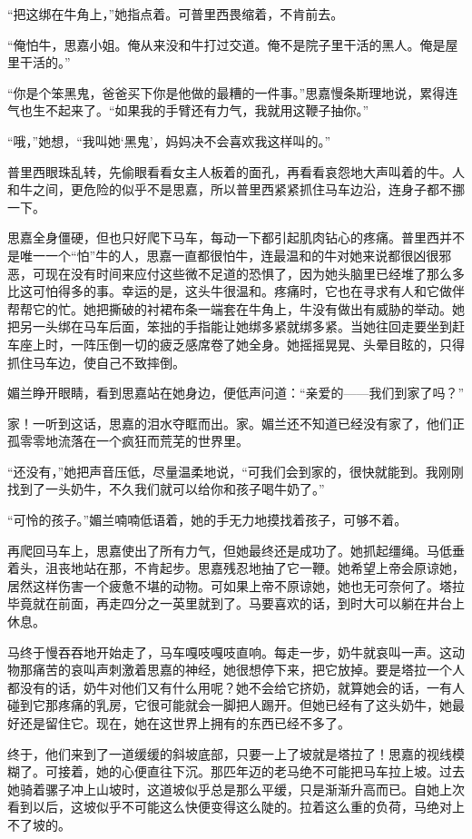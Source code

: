 \par “把这绑在牛角上，”她指点着。可普里西畏缩着，不肯前去。
\par “俺怕牛，思嘉小姐。俺从来没和牛打过交道。俺不是院子里干活的黑人。俺是屋里干活的。”
\par “你是个笨黑鬼，爸爸买下你是他做的最糟的一件事。”思嘉慢条斯理地说，累得连气也生不起来了。“如果我的手臂还有力气，我就用这鞭子抽你。”
\par “哦，”她想，“我叫她‘黑鬼’，妈妈决不会喜欢我这样叫的。”
\par 普里西眼珠乱转，先偷眼看看女主人板着的面孔，再看看哀怨地大声叫着的牛。人和牛之间，更危险的似乎不是思嘉，所以普里西紧紧抓住马车边沿，连身子都不挪一下。
\par 思嘉全身僵硬，但也只好爬下马车，每动一下都引起肌肉钻心的疼痛。普里西并不是唯一一个“怕”牛的人，思嘉一直都很怕牛，连最温和的牛对她来说都很凶很邪恶，可现在没有时间来应付这些微不足道的恐惧了，因为她头脑里已经堆了那么多比这可怕得多的事。幸运的是，这头牛很温和。疼痛时，它也在寻求有人和它做伴帮帮它的忙。她把撕破的衬裙布条一端套在牛角上，牛没有做出有威胁的举动。她把另一头绑在马车后面，笨拙的手指能让她绑多紧就绑多紧。当她往回走要坐到赶车座上时，一阵压倒一切的疲乏感席卷了她全身。她摇摇晃晃、头晕目眩的，只得抓住马车边，使自己不致摔倒。
\par 媚兰睁开眼睛，看到思嘉站在她身边，便低声问道：“亲爱的——我们到家了吗？”
\par 家！一听到这话，思嘉的泪水夺眶而出。家。媚兰还不知道已经没有家了，他们正孤零零地流落在一个疯狂而荒芜的世界里。
\par “还没有，”她把声音压低，尽量温柔地说，“可我们会到家的，很快就能到。我刚刚找到了一头奶牛，不久我们就可以给你和孩子喝牛奶了。”
\par “可怜的孩子。”媚兰喃喃低语着，她的手无力地摸找着孩子，可够不着。
\par 再爬回马车上，思嘉使出了所有力气，但她最终还是成功了。她抓起缰绳。马低垂着头，沮丧地站在那，不肯起步。思嘉残忍地抽了它一鞭。她希望上帝会原谅她，居然这样伤害一个疲惫不堪的动物。可如果上帝不原谅她，她也无可奈何了。塔拉毕竟就在前面，再走四分之一英里就到了。马要喜欢的话，到时大可以躺在井台上休息。
\par 马终于慢吞吞地开始走了，马车嘎吱嘎吱直响。每走一步，奶牛就哀叫一声。这动物那痛苦的哀叫声刺激着思嘉的神经，她很想停下来，把它放掉。要是塔拉一个人都没有的话，奶牛对他们又有什么用呢？她不会给它挤奶，就算她会的话，一有人碰到它那疼痛的乳房，它很可能就会一脚把人踢开。但她已经有了这头奶牛，她最好还是留住它。现在，她在这世界上拥有的东西已经不多了。
\par 终于，他们来到了一道缓缓的斜坡底部，只要一上了坡就是塔拉了！思嘉的视线模糊了。可接着，她的心便直往下沉。那匹年迈的老马绝不可能把马车拉上坡。过去她骑着骡子冲上山坡时，这道坡似乎总是那么平缓，只是渐渐升高而已。自她上次看到以后，这坡似乎不可能这么快便变得这么陡的。拉着这么重的负荷，马绝对上不了坡的。
